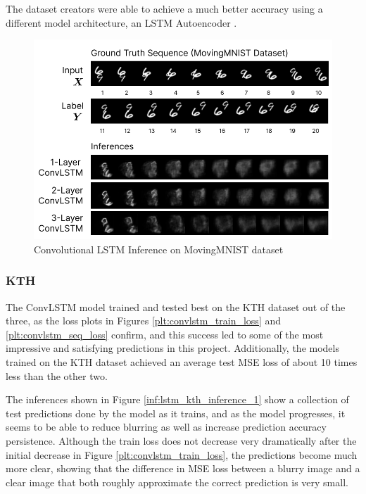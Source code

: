 \documentclass{scrartcl}
\begin{document}
The dataset creators were able to achieve a much better accuracy using a
different model architecture, an LSTM Autoencoder \cite{mmnist_dataset}.

\begin{figure}[H]
	\begin{center}
		\includegraphics[width=1\textwidth]{inferences/mmnist/mmnist_inferences_3.png}
	\end{center}
	\caption{Convolutional LSTM Inference on MovingMNIST dataset}
	\label{inf:convlstm_mmnist_inference_3}
\end{figure}

\subsubsection{KTH}
\label{subsubsec:kth}

The ConvLSTM model trained and tested best on the KTH dataset out of the three,
as the loss plots in Figures \ref{plt:convlstm_train_loss} and
\ref{plt:convlstm_seq_loss} confirm, and this success led to some of the most
impressive and satisfying predictions in this project. Additionally, the models
trained on the KTH dataset achieved an average test MSE loss of about 10 times
less than the other two.  

The inferences shown in Figure \ref{inf:lstm_kth_inference_1} show a collection
of test predictions done by the model as it trains, and as the model
progresses, it seems to be able to reduce blurring as well as increase
prediction accuracy persistence. Although the train loss does not decrease very
dramatically after the initial decrease in Figure
\ref{plt:convlstm_train_loss}, the predictions become much more clear, showing
that the difference in MSE loss between a blurry image and a clear image that
both roughly approximate the correct prediction is very small.
\end{document}

